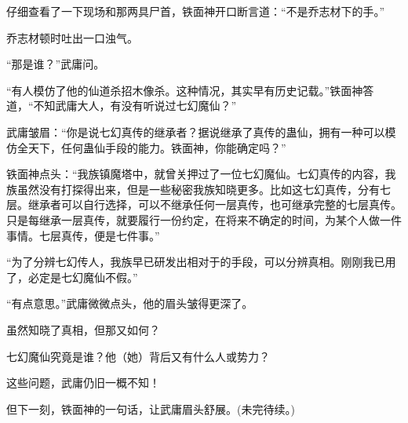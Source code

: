 \begin{this_body}
仔细查看了一下现场和那两具尸首，铁面神开口断言道：“不是乔志材下的手。”

乔志材顿时吐出一口浊气。

“那是谁？”武庸问。

“有人模仿了他的仙道杀招木像杀。这种情况，其实早有历史记载。”铁面神答道，“不知武庸大人，有没有听说过七幻魔仙？”

武庸皱眉：“你是说七幻真传的继承者？据说继承了真传的蛊仙，拥有一种可以模仿全天下，任何蛊仙手段的能力。铁面神，你能确定吗？”

铁面神点头：“我族镇魔塔中，就曾关押过了一位七幻魔仙。七幻真传的内容，我族虽然没有打探得出来，但是一些秘密我族知晓更多。比如这七幻真传，分有七层。继承者可以自行选择，可以不继承任何一层真传，也可继承完整的七层真传。只是每继承一层真传，就要履行一份约定，在将来不确定的时间，为某个人做一件事情。七层真传，便是七件事。”

“为了分辨七幻传人，我族早已研发出相对于的手段，可以分辨真相。刚刚我已用了，必定是七幻魔仙不假。”

“有点意思。”武庸微微点头，他的眉头皱得更深了。

虽然知晓了真相，但那又如何？

七幻魔仙究竟是谁？他（她）背后又有什么人或势力？

这些问题，武庸仍旧一概不知！

但下一刻，铁面神的一句话，让武庸眉头舒展。(未完待续。)

\end{this_body}

